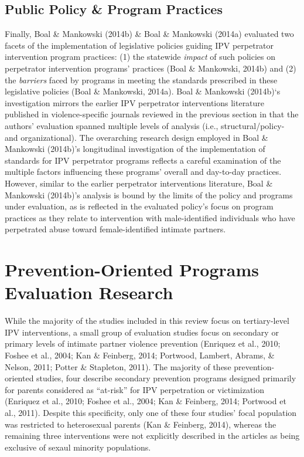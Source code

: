 \documentclass[11pt,]{tufte-book}
\begin{document}
\section{Public Policy \& Program
Practices}\label{public-policy-program-practices}

Finally, Boal \& Mankowski (2014b) \& Boal \& Mankowski (2014a)
evaluated two facets of the implementation of legislative policies
guiding IPV perpetrator intervention program practices: (1) the
statewide \emph{impact} of such policies on perpetrator intervention
programs' practices (Boal \& Mankowski, 2014b) and (2) the
\emph{barriers} faced by programs in meeting the standards prescribed in
these legislative policies (Boal \& Mankowski, 2014a). Boal \& Mankowski
(2014b)`s investigation mirrors the earlier IPV perpetrator
interventions literature published in violence-specific journals
reviewed in the previous section in that the authors' evaluation spanned
multiple levels of analysis (i.e., structural/policy- and
organizational). The overarching research design employed in Boal \&
Mankowski (2014b)'s longitudinal investigation of the implementation of
standards for IPV perpetrator programs reflects a careful examination of
the multiple factors influencing these programs' overall and day-to-day
practices. However, similar to the earlier perpetrator interventions
literature, Boal \& Mankowski (2014b)'s analysis is bound by the limits
of the policy and programs under evaluation, as is reflected in the
evaluated policy's focus on program practices as they relate to
intervention with male-identified individuals who have perpetrated abuse
toward female-identified intimate partners.

\chapter{Prevention-Oriented Programs Evaluation
Research}\label{prevention-oriented-programs-evaluation-research}

While the majority of the studies included in this review focus on
tertiary-level IPV interventions, a small group of evaluation studies
focus on secondary or primary levels of intimate partner violence
prevention (Enriquez et al., 2010; Foshee et al., 2004; Kan \& Feinberg,
2014; Portwood, Lambert, Abrams, \& Nelson, 2011; Potter \& Stapleton,
2011). The majority of these prevention-oriented studies, four describe
secondary prevention programs designed primarily for parents considered
as ``at-risk'' for IPV perpetration or victimization (Enriquez et al.,
2010; Foshee et al., 2004; Kan \& Feinberg, 2014; Portwood et al.,
2011). Despite this specificity, only one of these four studies' focal
population was restricted to heterosexual parents (Kan \& Feinberg,
2014), whereas the remaining three interventions were not explicitly
described in the articles as being exclusive of sexaul minority
populations.
\end{document}
